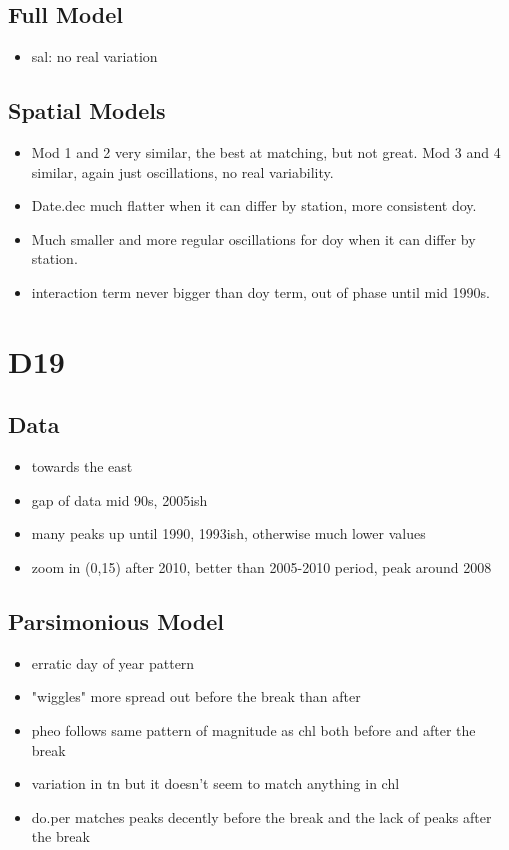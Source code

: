\documentclass[12pt]{amsart}
\begin{document}
\subsection{Full Model}
\begin{itemize}
\item sal: no real variation
\end{itemize}

\subsection{Spatial Models}

\begin{itemize}
\item Mod 1 and 2 very similar, the best at matching, but not great. Mod 3 and 4 similar, again just oscillations, no real variability. 
\item Date.dec much flatter when it can differ by station, more consistent doy.
\item Much smaller and more regular oscillations for doy when it can differ by station.
\item interaction term never bigger than doy term, out of phase until mid 1990s.
\end{itemize}


\section{D19}
\subsection{Data}
\begin{itemize}
\item towards the east
\item gap of data mid 90s, 2005ish
\item many peaks up until 1990, 1993ish, otherwise much lower values
\item zoom in (0,15) after 2010, better than 2005-2010 period, peak around 2008
\end{itemize}
\subsection{Parsimonious Model}
\begin{itemize}
\item erratic day of year pattern
\item "wiggles" more spread out before the break than after
\item pheo follows same pattern of magnitude as chl both before and after the break
\item variation in tn but it doesn't seem to match anything in chl
\item do.per matches peaks decently before the break and the lack of peaks after the break
\end{itemize}
\end{document}
